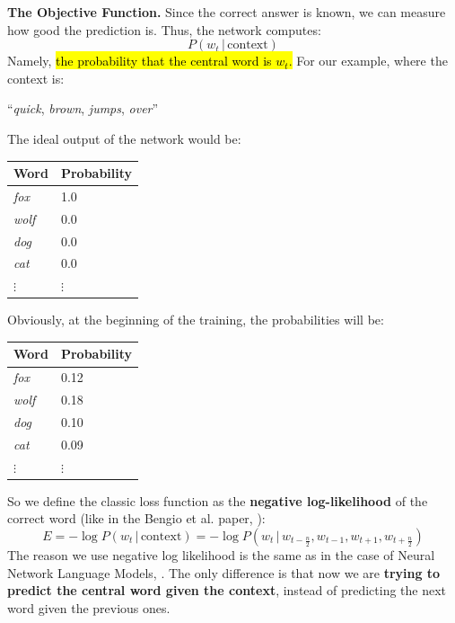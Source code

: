 \highspace
\textcolor{Green3}{ \textbf{The Objective Function.}} Since the correct answer is known, we can measure how good the prediction is. Thus, the network computes:
\begin{equation*}
    P\left(w_t \, | \, \text{context}\right)
\end{equation*}
Namely, \hl{the probability that the central word is $w_t$.} For our example, where the context is:
\begin{center}
    ``\emph{quick}, \emph{brown}, \emph{jumps}, \emph{over}''
\end{center}
The ideal output of the network would be:
\begin{center}
    \begin{tabular}{@{} l l @{}}
        \toprule
        \textbf{Word} & \textbf{Probability} \\
        \midrule
        \emph{fox} & 1.0 \\
        \emph{wolf} & 0.0 \\
        \emph{dog} & 0.0 \\
        \emph{cat} & 0.0 \\
        $\vdots$ & $\vdots$ \\
        \bottomrule
    \end{tabular}
\end{center}
\noindent
Obviously, at the beginning of the training, the probabilities will be:
\begin{center}
    \begin{tabular}{@{} l l @{}}
        \toprule
        \textbf{Word} & \textbf{Probability} \\
        \midrule
        \emph{fox} & 0.12 \\
        \emph{wolf} & 0.18 \\
        \emph{dog} & 0.10 \\
        \emph{cat} & 0.09 \\
        $\vdots$ & $\vdots$ \\
        \bottomrule
    \end{tabular}
\end{center}
\noindent
So we define the classic loss function as the \textbf{negative log-likelihood} of the correct word (like in the Bengio et al. paper, ):
\begin{equation}\label{eq:negative-log-likelihood-loss-cbow}
    E = -\log P\left(w_t \, | \, \text{context}\right) = -\log P\left(w_t \, | \, w_{t-\frac{n}{2}}, w_{t-1}, w_{t+1}, w_{t+\frac{n}{2}}\right)
\end{equation}
The reason we use negative log likelihood is the same as in the case of Neural Network Language Models, . The only difference is that now we are \textbf{trying to predict the central word given the context}, instead of predicting the next word given the previous ones.

